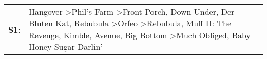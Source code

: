\begin{supertabular}{p{0.03\textwidth}p{0.92\textwidth}}
 \textbf{S1}:  &  Hangover\textsuperscript{} \textgreater \enspace Phil's Farm\textsuperscript{} \textgreater \enspace Front Porch\textsuperscript{}, \enspace Down Under\textsuperscript{}, \enspace Der Bluten Kat\textsuperscript{}, \enspace Rebubula\textsuperscript{} \textgreater \enspace Orfeo\textsuperscript{} \textgreater \enspace Rebubula\textsuperscript{}, \enspace Muff II: The Revenge\textsuperscript{}, \enspace Kimble\textsuperscript{}, \enspace Avenue\textsuperscript{}, \enspace Big Bottom\textsuperscript{} \textgreater \enspace Much Obliged\textsuperscript{}, \enspace Baby Honey Sugar Darlin'\textsuperscript{}  \enspace  \\
\end{supertabular}

